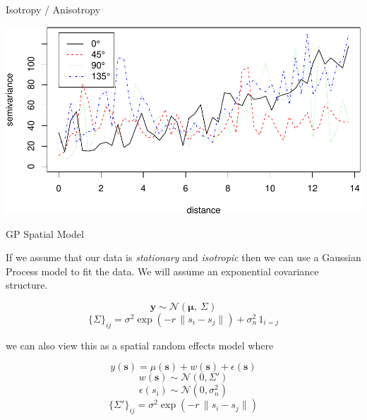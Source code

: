 \documentclass[11pt,ignorenonframetext,]{beamer}
\newenvironment{Shaded}{}{}
\newcommand{\DataTypeTok}[1]{\textcolor[rgb]{0.56,0.13,0.00}{#1}}
\newcommand{\DecValTok}[1]{\textcolor[rgb]{0.25,0.63,0.44}{#1}}
\newcommand{\KeywordTok}[1]{\textcolor[rgb]{0.00,0.44,0.13}{\textbf{#1}}}
\newcommand{\NormalTok}[1]{#1}
\newcommand{\OperatorTok}[1]{\textcolor[rgb]{0.40,0.40,0.40}{#1}}
\newcommand{\OtherTok}[1]{\textcolor[rgb]{0.00,0.44,0.13}{#1}}
\newcommand{\StringTok}[1]{\textcolor[rgb]{0.25,0.44,0.63}{#1}}
\let\oldShaded\Shaded
\let\endoldShaded\endShaded
\renewenvironment{Shaded}{\footnotesize\begin{spacing}{0.9}\oldShaded}{\endoldShaded\end{spacing}}
\let\oldverbatim\verbatim
\let\endoldverbatim\endverbatim
\newcommand{\scriptoutput}{
  \renewenvironment{Shaded}{\scriptsize\begin{spacing}{0.9}\oldShaded}{\endoldShaded\end{spacing}}
  \renewenvironment{verbatim}{\scriptsize\begin{spacing}{0.9}\oldverbatim}{\endoldverbatim\end{spacing}}
}
\begin{document}
\begin{frame}[fragile]{Isotropy / Anisotropy}
\protect\hypertarget{isotropy-anisotropy}{}

\scriptoutput

\begin{Shaded}
\end{Shaded}

\begin{center}\includegraphics[width=\textwidth]{Lec19_files/figure-beamer/unnamed-chunk-35-1} \end{center}

\end{frame}

\begin{frame}{GP Spatial Model}
\protect\hypertarget{gp-spatial-model}{}

\small

If we assume that our data is \emph{stationary} and \emph{isotropic}
then we can use a Gaussian Process model to fit the data. We will assume
an exponential covariance structure.

\[ \symbf{y} \sim \mathcal{N}(\symbf{\mu},~\Sigma) \]
\[ \{\Sigma\}_{ij} = \sigma^2 \exp(- r \, \lVert s_i - s_j\lVert) + \sigma^2_n \, 1_{i=j} \]

\pause

we can also view this as a spatial random effects model where

\[ y(\symbf{s}) = \mu(\symbf{s}) + w(\symbf{s}) + \epsilon(\symbf{s}) \]
\[ w(\symbf{s}) \sim \mathcal{N}(0,\Sigma') \]
\[ \epsilon(s_i) \sim \mathcal{N}(0,\sigma^2_n) \]
\[ \{\Sigma'\}_{ij} = \sigma^2 \exp(- r \, \lVert s_i - s_j\lVert) \]

\end{frame}
\end{document}
